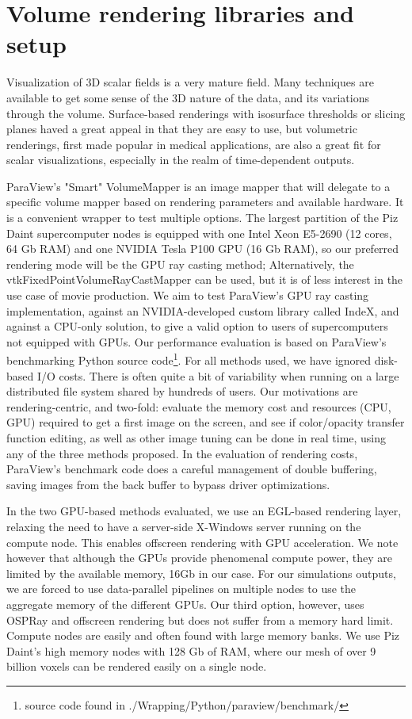 \documentclass[final,5p,times,twocolumn]{elsarticle}
\begin{document}
\section{Volume rendering libraries and setup}

Visualization of 3D scalar fields is a very mature field. Many techniques are
available to get some sense of the 3D nature of the data, and its variations
through the volume. Surface-based renderings with isosurface thresholds or
slicing planes haved a great appeal in that they are easy to use, but volumetric
renderings, first made popular in medical applications, are also a great fit for
scalar visualizations, especially in the realm of time-dependent outputs.

ParaView's "Smart" VolumeMapper is an image mapper
that will delegate to a specific volume mapper based on rendering parameters and
available hardware. It is a convenient
wrapper to test multiple options. The largest partition of the Piz Daint supercomputer
nodes is equipped with one Intel Xeon E5-2690 (12 cores, 64 Gb RAM) and one NVIDIA
Tesla P100 GPU (16 Gb RAM), so our preferred rendering mode will be the GPU ray
casting method;
Alternatively, the vtkFixedPointVolumeRayCastMapper can be used, but it is of
less interest in the use case of movie production. We aim to test ParaView's GPU
ray casting implementation, against an NVIDIA-developed custom library called
IndeX, and against a CPU-only solution, to give a valid option to users of
supercomputers not equipped with GPUs.
Our performance evaluation is based on ParaView's benchmarking Python source
code\footnote{source code found in ./Wrapping/Python/paraview/benchmark/}.
\newline
For all methods used, we have ignored disk-based I/O costs. There is often quite
a bit of variability when running on a large distributed file system shared by
hundreds of users. Our motivations are rendering-centric, and two-fold:
evaluate the memory cost and resources (CPU, GPU) required to get a first image
on the screen, and see if color/opacity transfer
function editing, as well as other image tuning can be done in real time, using
any of the three methods proposed. In the evaluation of rendering costs, ParaView's
benchmark code does a careful management of double buffering, saving images from
the back buffer to bypass driver optimizations.

In the two GPU-based methods evaluated, we use an EGL-based rendering layer,
relaxing the need to have a server-side X-Windows server running on the compute node.
This enables offscreen rendering with GPU acceleration. We note however that although
the GPUs provide phenomenal compute power, they are limited by the available memory,
16Gb in our case. For our simulations outputs, we are forced to use data-parallel
pipelines on multiple nodes to use the aggregate memory of the different GPUs.
\newline
Our third option, however, uses OSPRay and offscreen rendering but does not suffer
from a memory hard limit. Compute nodes are easily and often found with large memory
banks. We use Piz Daint's high memory nodes with 128 Gb of RAM, where our mesh of
over 9 billion voxels can be rendered easily on a single node.
\end{document}
